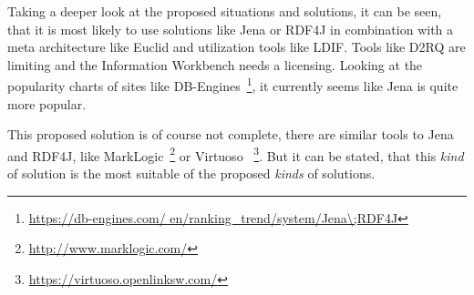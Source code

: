 Taking a deeper look at the proposed situations and solutions, it can be seen, 
that it is most likely to use solutions like Jena or RDF4J in combination with a 
meta architecture like Euclid and utilization tools like LDIF. Tools like D2RQ are 
limiting and the Information Workbench needs a licensing. Looking at the 
popularity charts of sites like DB-Engines~\footnote{\url{https://db-engines.com/
en/ranking_trend/system/Jena\;RDF4J}}, it currently seems like Jena is quite more 
popular.

This proposed solution is of course not complete, there are similar tools to Jena 
and RDF4J, like MarkLogic~\footnote{\url{http://www.marklogic.com/}} or Virtuoso~
\footnote{\url{https://virtuoso.openlinksw.com/}}. But it can be stated, that this 
\textit{kind} of solution is the most suitable of the proposed \textit{kinds} of 
solutions.